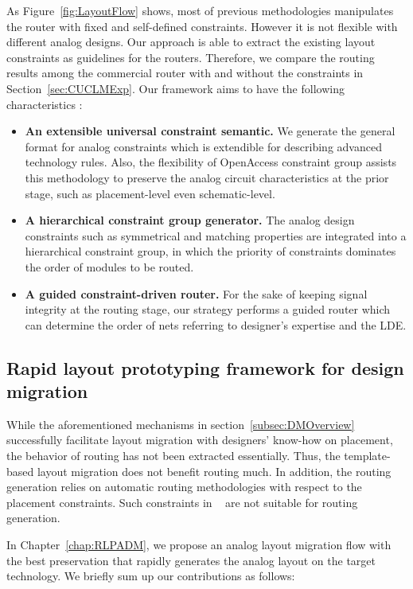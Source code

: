       As Figure~\ref{fig:LayoutFlow} shows, most of previous methodologies manipulates the router with fixed and self-defined constraints. However it is not flexible with different analog designs. Our approach is able to extract the existing layout constraints as guidelines for the routers. Therefore, we compare the routing results among the commercial router with and without the constraints in Section~\ref{sec:CUCLMExp}. Our framework aims to have the following characteristics :
      \begin{itemize}
        \item {\bf An extensible universal constraint semantic.} We generate the general format for analog constraints which is extendible for describing advanced technology rules. Also, the flexibility of OpenAccess constraint group assists this methodology to preserve the analog circuit characteristics at the prior stage, such as placement-level even schematic-level.
        \item {\bf A hierarchical constraint group generator.} The analog design constraints such as symmetrical and matching properties are integrated into a hierarchical constraint group, in which the priority of constraints dominates the order of modules to be routed.
        \item {\bf A guided constraint-driven router.} For the sake of keeping signal integrity at the routing stage, our strategy performs a guided router which can determine the order of nets referring to designer's expertise and the LDE.
      \end{itemize}

    \subsection{Rapid layout prototyping framework for design migration}
    \label{subsec:DMRContribute}

      While the aforementioned mechanisms in section~\ref{subsec:DMOverview} successfully facilitate layout migration with designers' know-how on placement, the behavior of routing has not been extracted essentially. Thus, the template-based layout migration does not benefit routing much. In addition, the routing generation relies on automatic routing methodologies with respect to the placement constraints. Such constraints in ~\cite{cbc-bhattacharya-dac04,Bhattacharya_ASPDAC04,msc-bhattacharya-tcad06,Zhang_TCAD08,Wang_ALRGP_TODAES2011} are not suitable for routing generation. 

      In Chapter~\ref{chap:RLPADM}, we propose an analog layout migration flow with the best preservation that rapidly generates the analog layout on the target technology. We briefly sum up our contributions as follows:

